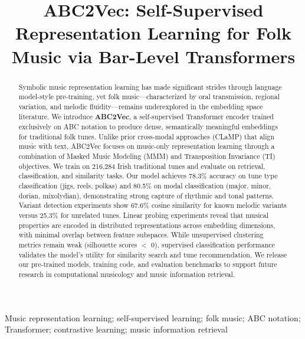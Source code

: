 \documentclass[]{interact}
\theoremstyle{plain}
\theoremstyle{definition}
\theoremstyle{remark}
\begin{document}

\title{ABC2Vec: Self-Supervised Representation Learning for Folk Music via Bar-Level Transformers}

\author{
}

\maketitle

\begin{abstract}
Symbolic music representation learning has made significant strides through language model-style pre-training, yet folk music---characterized by oral transmission, regional variation, and melodic fluidity---remains underexplored in the embedding space literature. We introduce \textbf{ABC2Vec}, a self-supervised Transformer encoder trained exclusively on ABC notation to produce dense, semantically meaningful embeddings for traditional folk tunes. Unlike prior cross-modal approaches (CLaMP) that align music with text, ABC2Vec focuses on music-only representation learning through a combination of Masked Music Modeling (MMM) and Transposition Invariance (TI) objectives. We train on 216,284 Irish traditional tunes and evaluate on retrieval, classification, and similarity tasks. Our model achieves 78.3\% accuracy on tune type classification (jigs, reels, polkas) and 80.5\% on modal classification (major, minor, dorian, mixolydian), demonstrating strong capture of rhythmic and tonal patterns. Variant detection experiments show 67.6\% cosine similarity for known melodic variants versus 25.3\% for unrelated tunes. Linear probing experiments reveal that musical properties are encoded in distributed representations across embedding dimensions, with minimal overlap between feature subspaces. While unsupervised clustering metrics remain weak (silhouette scores $<$ 0), supervised classification performance validates the model's utility for similarity search and tune recommendation. We release our pre-trained models, training code, and evaluation benchmarks to support future research in computational musicology and music information retrieval.
\end{abstract}

\begin{keywords}
Music representation learning; self-supervised learning; folk music; ABC notation; Transformer; contrastive learning; music information retrieval
\end{keywords}
\end{document}
